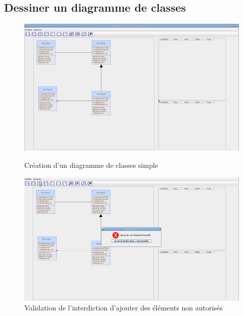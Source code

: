 \documentclass[12pt,a4paper,openany]{report}
\begin{document}
		\subsection{Dessiner un diagramme de classes}
		\begin{figure}[H]
			\centering
			\includegraphics[width=18cm]{validation1.jpg}
			\caption{Création d'un diagramme de classes simple}
			\includegraphics[width=18cm]{validation2.jpg}
			\caption{Validation de l'interdiction d'ajouter des éléments non autorisés}
		\end{figure}
\end{document}
